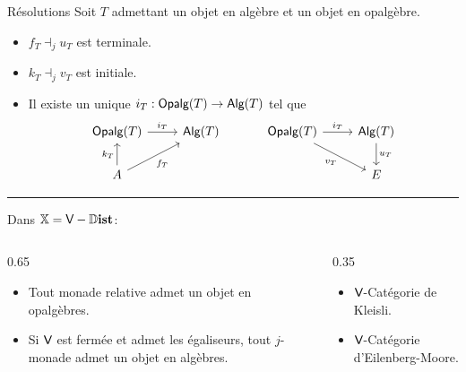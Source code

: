 \documentclass[9pt]{beamer}
\newcommand{\bb}[1]{\mathbb{#1}}
\newcommand{\cat}[1]{\textcat{#1}}
\newcommand{\textcat}[1]{{\normalfont\textsf{#1}}}
\DeclareMathOperator{\Alg}{\cat{Alg}}
\DeclareMathOperator{\Dist}{\bb{D}\textbf{ist}}
\DeclareMathOperator{\Opalg}{\cat{Opalg}}
\begin{document}
\begin{frame}{Résolutions}
    Soit $T$ admettant un objet en algèbre et un objet en opalgèbre.
    \begin{itemize}
        \item $f_T\dashv_ju_T$ est terminale.
        \item $k_T\dashv_jv_T$ est initiale.
        \item Il existe un unique $i_T : \Opalg(T) \to \Alg(T)$ tel que
        \[\begin{tikzcd}[ampersand replacement=\&]
            {\Opalg(T)} \ar[r, "i_T"] \& {\Alg(T)}\\
            A \ar[u, "k_T"] \ar[ur, "f_T"']
        \end{tikzcd}
        \hspace{3em}
        \begin{tikzcd}[ampersand replacement=\&]
            {\Opalg(T)} \ar[r, "i_T"] \ar[dr, "v_T"'] \& {\Alg(T)} \ar[d, "u_T"]\\
                                                      \& E
        \end{tikzcd}\]
    \end{itemize}
    \vspace{\baselineskip}
    \hrule
    \vspace{\baselineskip}
    Dans $\bb X = \cat V-\Dist$:
    \begin{columns}[T]
        \begin{column}{0.65\textwidth}
            \begin{itemize}
                \item Tout monade relative admet un objet en opalgèbres.
                \item Si $\cat V$ est fermée et admet les égaliseurs, tout $j$-monade admet un objet en algèbres.
            \end{itemize}
        \end{column}
        \vrule{}
        \begin{column}{0.35\textwidth}
            \begin{itemize}
                \item $\cat V$-Catégorie de Kleisli.
                \item $\cat V$-Catégorie d'Eilenberg-Moore.
            \end{itemize}
        \end{column}
    \end{columns}
\end{frame}
\end{document}
